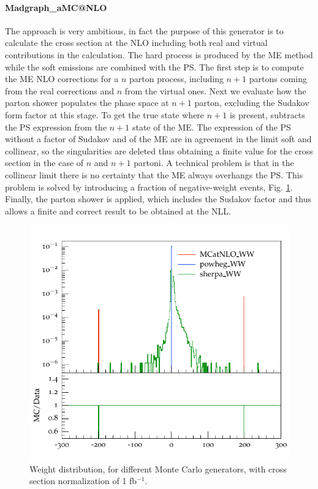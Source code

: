  
\paragraph{Madgraph\_aM{\footnotesize C@NLO}}
The \aMC \cite{bib:madgraph} approach is very ambitious, in fact the purpose of this generator is to calculate the cross section at the NLO including both real and virtual contributions in the calculation. The  hard process is produced by the ME method while the soft emissions are combined with the PS.
The first step is to compute the ME NLO corrections for a $ n $ parton process, including $ n + 1 $ partons coming from the real corrections and $ n $ from the virtual ones. Next we evaluate how the parton shower populates the phase space at $ n + 1 $ parton, excluding the Sudakov form factor at this stage. To get the  true  state where $ n + 1 $ is present, \aMC subtracts the PS expression from the $ n + 1 $ state of the ME. The expression of the PS without a factor of Sudakov and of the ME are in agreement in the limit soft and collinear, so the singularities are deleted thus obtaining a finite value for the cross section in the case of $ n $ and $ n + 1 $ partoni. A technical problem is that in the collinear limit there is no certainty that the ME always overhangs the PS. This problem is solved by introducing a fraction of negative-weight events, Fig. \ref{weight}. Finally, the parton shower is applied, which includes the Sudakov factor and thus allows a finite and correct result to be obtained at the NLL. 
 
 
 
\begin{figure}
\centering
\includegraphics[scale= 0.7]{../Cap3/Fig_MC/weight}
\caption{Weight distribution, for different Monte Carlo generators, with cross section normalization of 1 fb$^{-1}$.}
\label{weight}
\end{figure}
 

